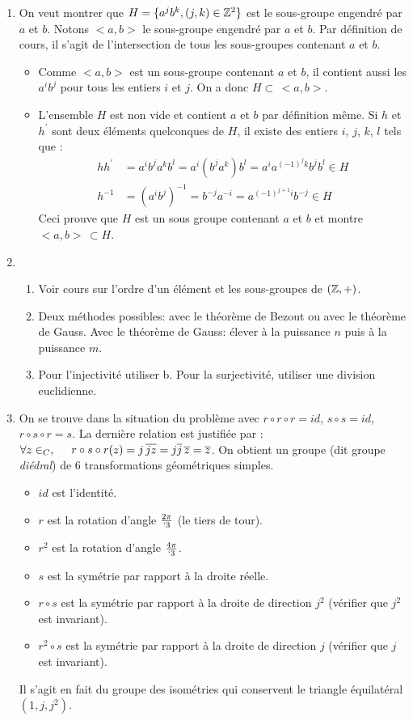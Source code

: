 \begin{enumerate}
\item On veut montrer que $H=\{a^j b^k ,(j,k)\in \mathbb{Z}^2\}$ est le sous-groupe engendré par $a$ et $b$. Notons $<a,b>$ le sous-groupe engendré par $a$ et $b$. Par définition de cours, il s'agit de l'intersection de tous les sous-groupes contenant $a$ et $b$.
\begin{itemize}
 \item Comme $<a,b>$ est un sous-groupe contenant $a$ et $b$, il contient aussi les $a^{i}b^j$ pour tous les entiers $i$ et $j$. On a donc $H\subset\, <a,b>$.
\item L'ensemble $H$ est non vide et contient $a$ et $b$ par définition même. Si $h$ et $h^\prime$ sont deux éléments quelconques de $H$, il existe des entiers $i$, $j$, $k$, $l$ tels que :
\begin{align*}
 hh^\prime &=a^i b^j a^k b^l = a^i (b^j a^k )b^l = a^i a^{(-1)^jk} b^j b^l \in H \\
 h^{-1}&= (a^i b^j)^{-1}= b^{-j}a^{-i}=a^{(-1)^{j+1}i}b^{-j}\in H
\end{align*}
Ceci prouve que $H$ est un sous groupe contenant $a$ et $b$ et montre $<a,b>\, \subset H$.
\end{itemize}
 \item \begin{enumerate}
 \item Voir cours sur l'ordre d'un élément et les sous-groupes de $(\mathbb{Z},+)$.
\item Deux méthodes possibles: avec le théorème de Bezout ou avec le théorème de Gauss. Avec le théorème de Gauss: élever à la puissance $n$ puis à la puissance $m$.
\item Pour l'injectivité utiliser b. Pour la surjectivité, utiliser une division euclidienne.
\end{enumerate}

\item On se trouve dans la situation du problème avec $r\circ r \circ r = id$, $s \circ s = id$, $r  \circ s \circ r = s$. 
La dernière relation est justifiée par : $\forall z \in _C, \hspace{0.5cm}  r  \circ s \circ r (z)= j\,\overline{jz}=j\overline{j}\,\overline{z}=\overline{z}$.\newline
On obtient un groupe (dit groupe \emph{diédral}) de $6$ transformations géométriques simples.
\begin{itemize}
 \item $id$ est l'identité.
\item $r$ est la rotation d'angle $\frac{2\pi}{`3}$ (le \og tiers de tour\fg ).
\item $r^2$ est la rotation d'angle $\frac{4\pi}{`3}$.
\item $s$ est la symétrie par rapport à la droite réelle.
\item $r\circ s$ est la symétrie par rapport à la droite de direction $j^2$ (vérifier que $j^2$ est invariant).
\item $r^2\circ s$ est la symétrie par rapport à la droite de direction $j$ (vérifier que $j$ est invariant).
\end{itemize}
Il s'agit en fait du groupe des isométries qui conservent le triangle équilatéral $(1,j,j^2)$.
\end{enumerate}
